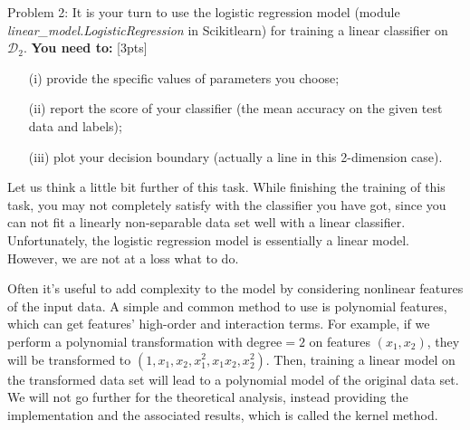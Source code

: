 \documentclass[10pt]{article}
\begin{document}
{\color{red}Problem 2:} It is your turn to use the logistic regression model (module \emph{linear\_model.LogisticRegression} in Scikitlearn) for training a linear classifier on $\mathcal{D}_2$. \textbf{You need to:} {\color{red}[3pts]}
\begin{enumerate}
	\item[(i)] provide the specific values of parameters you choose;
	\item[(ii)] report the score of your classifier (the mean accuracy on the given test data and labels);
	\item[(iii)] plot your decision boundary (actually a line in this 2-dimension case).  
\end{enumerate}

Let us think a little bit further of this task.
While finishing the training of this task, you may not completely satisfy with the classifier you have got, since you can not fit a linearly non-separable data set well with a linear classifier. Unfortunately, the logistic regression model is essentially a linear model. However, we are not at a loss what to do. 

Often it’s useful to add complexity to the model by considering nonlinear features of the input data. A simple and common method to use is polynomial features, which can get features’ high-order and interaction terms. For example, if we perform a polynomial transformation with degree$=2$ on features $(x_1, x_2)$, they will be transformed to $(1, x_1, x_2, x_1^2, x_1 x_2, x_2^2)$. Then, training a linear model on the transformed data set will lead to a polynomial model of the original data set. We will not go further for the theoretical analysis, instead providing the implementation and the associated results, which is called the kernel method.
 
\end{document}
